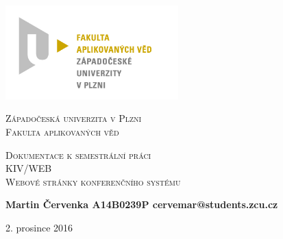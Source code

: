 \documentclass[a4paper]{article}
\begin{document}
	\begin{titlepage}
		\includegraphics[width=0.5\textwidth]{logo.jpg}
		\par
		\centering
		\vspace{1cm}
		{\scshape\LARGE Z\'apado\v{c}esk\'a univerzita v Plzni\\Fakulta aplikovan\'ych v\v{e}d \par}
		\vspace{1cm}
		{\scshape\Huge Dokumentace k semestr\'aln\'i pr\'aci\\KIV/WEB\\Webov\'e str\'anky konferen\v{c}n\'iho
		syst\'emu \par}
		\vspace{1.5cm}
		{\Large\bfseries Martin \v{C}ervenka A14B0239P cervemar@students.zcu.cz \par}
		\vfill
		{\large 2. prosince 2016\par}
	\end{titlepage}
\end{document}
